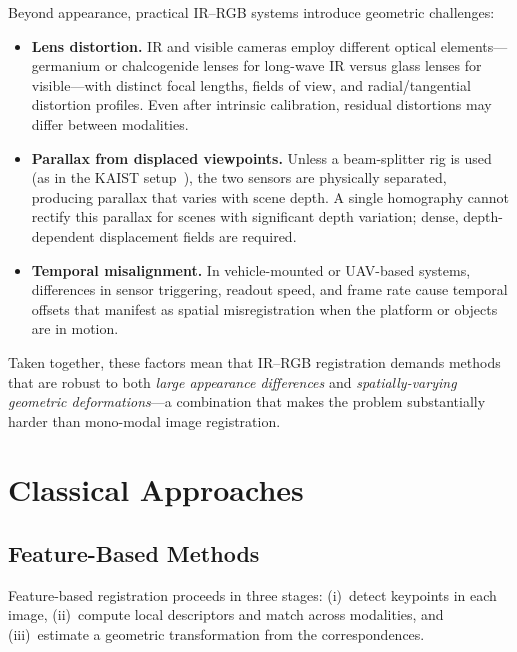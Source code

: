 Beyond appearance, practical IR--RGB systems introduce geometric challenges:

\begin{itemize}
  \item \textbf{Lens distortion.} IR and visible cameras employ different
    optical elements---germanium or chalcogenide lenses for long-wave IR versus
    glass lenses for visible---with distinct focal lengths, fields of view, and
    radial/tangential distortion profiles. Even after intrinsic calibration,
    residual distortions may differ between modalities.
  \item \textbf{Parallax from displaced viewpoints.} Unless a beam-splitter
    rig is used (as in the KAIST setup~\cite{hwang2015multispectral}), the two
    sensors are physically separated, producing parallax that varies with scene
    depth. A single homography cannot rectify this parallax for scenes with
    significant depth variation; dense, depth-dependent displacement fields are
    required.
  \item \textbf{Temporal misalignment.} In vehicle-mounted or UAV-based systems,
    differences in sensor triggering, readout speed, and frame rate cause
    temporal offsets that manifest as spatial misregistration when the platform
    or objects are in motion.
\end{itemize}

Taken together, these factors mean that IR--RGB registration demands methods
that are robust to both \emph{large appearance differences} and
\emph{spatially-varying geometric deformations}---a combination that makes the
problem substantially harder than mono-modal image registration.


\section{Classical Approaches}
\label{sec:classical-approaches}

\subsection{Feature-Based Methods}
\label{subsec:feature-based}

Feature-based registration proceeds in three stages: (i)~detect keypoints in
each image, (ii)~compute local descriptors and match across modalities, and
(iii)~estimate a geometric transformation from the correspondences.

